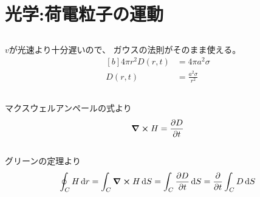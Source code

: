 \documentclass[../ap_2014.tex]{subfiles}
\begin{document}
\setcounter{chapter}{2}
\chapter{光学:荷電粒子の運動}
\section{}
\(v\)が光速より十分遅いので、
ガウスの法則がそのまま使える。
\begin{equation}\begin{aligned}[b]
    4\pi r^2D(r,t) &= 4\pi a^2\sigma\\
    D(r,t) &= \frac{a^2\sigma}{r^2}
\end{aligned}\end{equation}

\section{}
マクスウェルアンペールの式より
\begin{equation}\begin{aligned}[b]
    \curl{H}=\pdv{D}{t}
\end{aligned}\end{equation}

\section{}
グリーンの定理より
\begin{equation}\begin{aligned}[b]
    \oint_C H \dd{r} =\int_C \curl H \dd{S} = \int_C \pdv{D}{t}\dd{S} = \pdv{t}\int_C D\dd{S}
\end{aligned}\end{equation}
\end{document}
